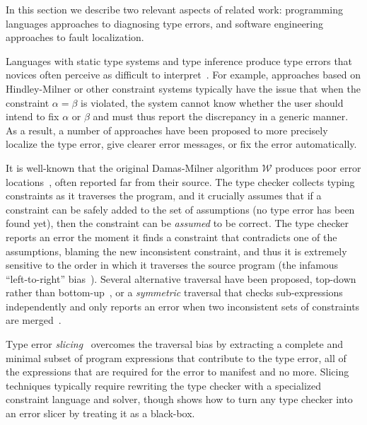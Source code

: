 \label{sec:related-work}

In this section we describe two relevant aspects of related work:
%
programming languages approaches to diagnosing type errors, and
%
software engineering approaches to fault localization.
%

\label{sec:type-error-diagnosis}
Languages with static type systems and type inference produce type
errors that novices often perceive as difficult to
interpret~\citep{Wand1986-nw}.
%
For example, approaches based on Hindley-Milner or other constraint
systems typically have the issue that when the constraint $\alpha=\beta$
is violated, the system cannot know whether the user should intend to
fix $\alpha$ or $\beta$ and must thus report the discrepancy in a
generic manner.
%
As a result, a number of approaches have been proposed to
more precisely localize the type error,
give clearer error messages, or
fix the error automatically.
%

It is well-known that the original Damas-Milner algorithm $\mathcal{W}$
produces poor error locations~\citep{Wand1986-nw}, often reported far
from their source.
%
The type checker collects typing constraints as it traverses the
program, and it crucially assumes that if a constraint can be safely
added to the set of assumptions (\ie no type error has been found yet),
then the constraint can be \emph{assumed} to be correct.
%
The type checker reports an error the moment it finds a constraint that
contradicts one of the assumptions, blaming the new inconsistent
constraint, and thus it is extremely sensitive to the order in which it
traverses the source program (the infamous ``left-to-right''
bias~\citep{McAdam1998-ub}).
%
Several alternative traversal have been proposed, \eg
top-down rather than bottom-up~\citep{Lee1998-ys}, or a \emph{symmetric}
traversal that checks sub-expressions independently and only reports an
error when two inconsistent sets of constraints are
merged~\citep{McAdam1998-ub,Yang1999-yr}.

Type error \emph{slicing}~\citep{Haack2003-vc,Tip2001-qp,Rahli2010-ps}
overcomes the traversal bias by extracting a complete and minimal subset
of program expressions that contribute to the type error, \ie all of the
expressions that are required for the error to manifest and no more.
%
Slicing techniques typically require rewriting the type checker with a
specialized constraint language and solver, though
\citet{Schilling2011-yf} shows how to turn any type checker into an
error slicer by treating it as a black-box.

